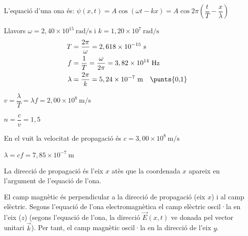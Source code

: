 \begin{solapartat}
 L'equació d'una ona és: $\psi(x, t) = A\cos(\omega t - kx) = A\cos 2\pi\left(\dfrac{t}{T} - \dfrac{x}{\lambda}\right)$

 Llavors $\omega = 2,40\times 10^{15}\ \mathrm{rad/s}$ i $k = 1,20\times 10^{7}\ \mathrm{rad/s}$
\begin{align*}
T &= \frac{2\pi}{\omega} = 2,618\times 10^{-15}\ \mathrm{s}\\
f &= \frac{1}{T} = \frac{\omega}{2\pi} = 3,82\times 10^{14}\ \mathrm{Hz}\\
\lambda &= \frac{2\pi}{k} = 5,24\times 10^{-7}\ \mathrm{m} \quad \text{\punts{0,1}}
\end{align*}

 $v = \dfrac{\lambda}{T} = \lambda f = 2,00\times 10^{8}\ \mathrm{m/s}$

 $n = \dfrac{c}{v} = 1,5$

 En el vuit la velocitat de propagació és $c = 3,00\times 10^{8}\ \mathrm{m/s}$

 $\lambda = cf = 7,85\times 10^{-7}\ \mathrm{m}$
\end{solapartat}

\begin{solapartat}
 La direcció de propagació és l'eix $x$ atès que la coordenada $x$ apareix en l'argument de l'equació de l'ona.

 El camp magnètic és perpendicular a la direcció de propagació (eix $x$) i al camp elèctric. Segons l'equació de l'ona electromagnètica el camp elèctric oscil·la en l'eix ($z$) (segons l'equació de l'ona, la direcció $\vec{E}(x, t)$ ve donada pel vector unitari $\vec{k}$). Per tant, el camp magnètic oscil·la en la direcció de l'eix $y$.
\end{solapartat}
